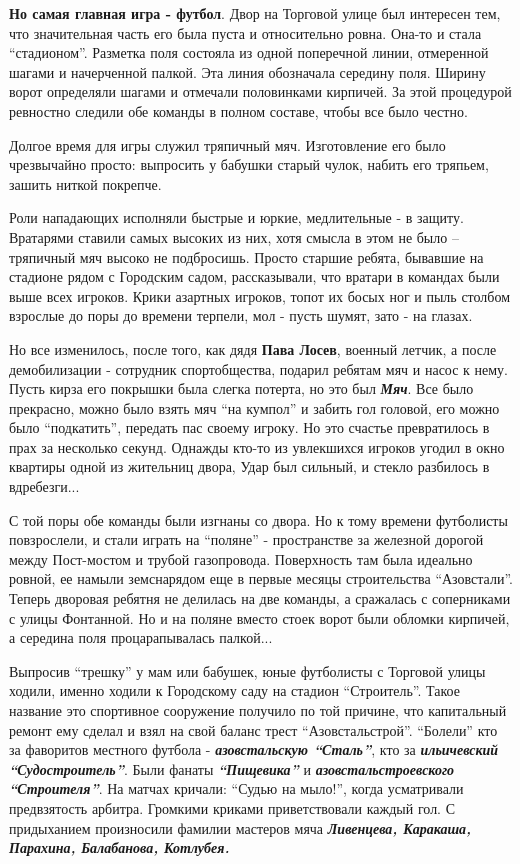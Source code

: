 \textbf{Но самая главная игра - футбол}. Двор на Торговой улице был интересен тем, что
значительная часть его была пуста и относительно ровна. Она-то и стала
\enquote{стадионом}. Разметка поля состояла из одной поперечной линии, отмеренной
шагами и начерченной палкой. Эта линия обозначала середину поля. Ширину ворот
определяли шагами и отмечали половинками кирпичей. За этой процедурой ревностно
следили обе команды в полном составе, чтобы все было честно.

Долгое время для игры служил тряпичный мяч. Изготовление его было чрезвычайно
просто: выпросить у бабушки старый чулок, набить его тряпьем, зашить ниткой
покрепче.

Роли нападающих исполняли быстрые и юркие, медлительные - в защиту. Вратарями
ставили самых высоких из них, хотя смысла в этом не было – тряпичный мяч высоко
не подбросишь. Просто старшие ребята, бывавшие на стадионе рядом с Городским
садом, рассказывали, что вратари в командах были выше всех игроков. Крики
азартных игроков, топот их босых ног и пыль столбом взрослые до поры до времени
терпели, мол - пусть шумят, зато - на глазах.

Но все изменилось, после того, как дядя \textbf{Пава Лосев}, военный летчик, а после
демобилизации - сотрудник спортобщества, подарил ребятам мяч и насос к нему.
Пусть кирза его покрышки была слегка потерта, но это был \textbf{\em Мяч}. Все было
прекрасно, можно было взять мяч \enquote{на кумпол} и забить гол головой, его можно
было \enquote{подкатить}, передать пас своему игроку. Но это счастье превратилось в
прах за несколько секунд. Однажды кто-то из увлекшихся игроков угодил в окно
квартиры одной из жительниц двора, Удар был сильный, и стекло разбилось в
вдребезги...

С той поры обе команды были изгнаны со двора. Но к тому времени футболисты
повзрослели, и стали играть на \enquote{поляне} - пространстве за железной дорогой
между Пост-мостом и трубой газопровода. Поверхность там была идеально ровной,
ее намыли земснарядом еще в первые месяцы строительства \enquote{Азовстали}. Теперь
дворовая ребятня не делилась на две команды, а сражалась с соперниками с улицы
Фонтанной. Но и на поляне вместо стоек ворот были обломки кирпичей, а середина
поля процарапывалась палкой...

Выпросив \enquote{трешку} у мам или бабушек, юные футболисты с Торговой улицы ходили,
именно ходили к Городскому саду на стадион \enquote{Строитель}. Такое название это
спортивное сооружение получило по той причине, что капитальный ремонт ему
сделал и взял на свой баланс трест \enquote{Азовстальстрой}. \enquote{Болели} кто за фаворитов
местного футбола - {\em\bfseries азовстальскую \enquote{Сталь}}, кто за {\em\bfseries ильичевский \enquote{Судостроитель}}.
Были фанаты {\em\bfseries\enquote{Пищевика}} и {\em\bfseries азовстальстроевского \enquote{Строителя}}. На матчах кричали:
\enquote{Судью на мыло!}, когда усматривали предвзятость арбитра. Громкими криками
приветствовали каждый гол. С придыханием произносили фамилии мастеров мяча
{\em\bfseries Ливенцева, Каракаша, Парахина, Балабанова, Котлубея.}

